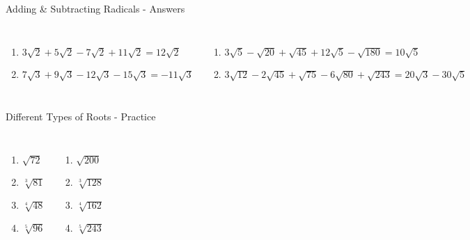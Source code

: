 \documentclass[aspectratio=169]{beamer}
\begin{document}
\begin{frame}{Adding \& Subtracting Radicals - Answers}
\begin{tcolorbox}[colback=lightgray,colframe=primary,title=Solutions]
\footnotesize
\begin{columns}[T]
\begin{enumerate}
  \item $3\sqrt{2} + 5\sqrt{2} - 7\sqrt{2} + 11\sqrt{2} = 12\sqrt{2}$
  \item $7\sqrt{3} + 9\sqrt{3} - 12\sqrt{3} - 15\sqrt{3} = -11\sqrt{3}$
\end{enumerate}
\begin{enumerate}
  \item $3\sqrt{5} - \sqrt{20} + \sqrt{45} + 12\sqrt{5} - \sqrt{180} = 10\sqrt{5}$
  \item $3\sqrt{12} - 2\sqrt{45} + \sqrt{75} - 6\sqrt{80} + \sqrt{243} = 20\sqrt{3} - 30\sqrt{5}$
\end{enumerate}
\end{columns}
\end{tcolorbox}
\end{frame}

\begin{frame}{Different Types of Roots - Practice}
\begin{tcolorbox}[colback=lightgray,colframe=accent,title=Practice Problems]
\footnotesize
\begin{columns}[T]
\begin{enumerate}
  \item $\sqrt{72}$
  \item $\sqrt[3]{81}$
  \item $\sqrt[4]{48}$
  \item $\sqrt[5]{96}$
\end{enumerate}
\begin{enumerate}
  \item $\sqrt{200}$
  \item $\sqrt[3]{128}$
  \item $\sqrt[4]{162}$
  \item $\sqrt[5]{243}$
\end{enumerate}
\end{columns}
\end{tcolorbox}
\end{frame}
\end{document}
